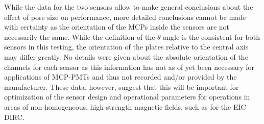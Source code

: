 While the data for the two sensors allow to make general conclusions about the effect of pore size on performance, more detailed conclusions cannot be made with certainty as the orientation of the MCPs inside the sensors are not necessarily the same. While the definition of the $\theta$ angle is the consistent for both sensors in this testing, the orientation of the plates relative to the central axis may differ greatly. No details were given about the absolute orientation of the channels for each sensor as this information has not as of yet been necessary for applications of MCP-PMTs and thus not recorded and/or provided by the manufacturer. These data, however, suggest that this will be important for optimization of the sensor design and operational parameters for operations in areas of non-homogeneous, high-strength magnetic fields, such as for the EIC DIRC.